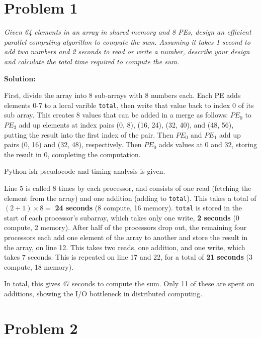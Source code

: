 \documentclass[12pt,letterpaper]{article}
\newcommand{\problem}[1]{\textit{#1} \medskip}
\newcommand{\solution}{ \noindent \textbf{Solution:} \medskip}
\begin{document}
\section*{Problem 1}

\problem{Given 64 elements in an array in shared memory and 8 PEs, design an efficient parallel
computing algorithm to compute the sum. Assuming it takes 1 second to add two numbers and 2 seconds
to read or write a number, describe your design and calculate the total time required to compute the
sum.}

\solution

First, divide the array into 8 sub-arrays with 8 numbers each. Each PE adds elements 0-7 to a local
varible \lstinline{total}, then write that value back to index 0 of its sub array.
This creates 8 values that can be added in
a merge as follows: $PE_0$ to $PE_3$ add up elements at index pairs (0, 8), (16, 24), (32, 40), and 
(48, 56), putting the result into the first index of the pair. Then $PE_0$ and $PE_1$ add up pairs 
(0, 16) and (32, 48), respectively. Then $PE_0$ adds values at 0 and 32, storing the result in 0,
completing the computation.

Python-ish pseudocode and timing analysis is given.



Line 5 is called 8 times by each processor, and consists of one read (fetching the element from the
array) and one addition (adding to \lstinline{total}). This takes a total of $(2+1)\times 8 =$
\textbf{24 seconds} (8 compute, 16 memory). 
\lstinline{total} is stored in the start of each processor's subarray, which takes only one
write, \textbf{2 seconds} (0 compute, 2 memory). After half of the processors drop out, the
remaining four processors each add one element of the array to another and store the result in the
array, on line 12. This takes two reads, one addition, and one write, which takes 7 seconds. This is
repeated on line 17 and 22, for a total of \textbf{21 seconds} (3 compute, 18 memory).

In total, this gives 47 seconds to compute the sum. Only 11 of these are spent on additions, showing
the I/O bottleneck in distributed computing.

\section*{Problem 2}
\end{document}
